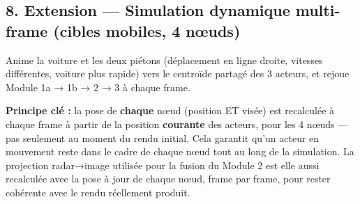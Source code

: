 \documentclass[11pt]{article}
\begin{document}
    \subsection{8. Extension --- Simulation dynamique multi-frame (cibles
mobiles, 4
nœuds)}\label{extension-simulation-dynamique-multi-frame-cibles-mobiles-4-nux153uds}

Anime la voiture et les deux piétons (déplacement en ligne droite,
vitesses différentes, voiture plus rapide) vers le centroïde partagé des
3 acteurs, et rejoue Module 1a → 1b → 2 → 3 à chaque frame.

\textbf{Principe clé :} la pose de \textbf{chaque} nœud (position ET
visée) est recalculée à chaque frame à partir de la position
\textbf{courante} des acteurs, pour les 4 nœuds --- pas seulement au
moment du rendu initial. Cela garantit qu'un acteur en mouvement reste
dans le cadre de chaque nœud tout au long de la simulation. La
projection radar→image utilisée pour la fusion du Module 2 est elle
aussi recalculée avec la pose à jour de chaque nœud, frame par frame,
pour rester cohérente avec le rendu réellement produit.
\end{document}
